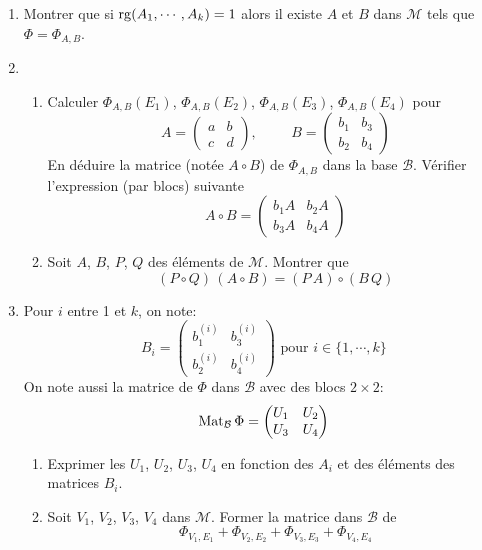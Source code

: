 \begin{enumerate}
\item Montrer que si $\operatorname{rg}(A_1,\cdots,A_k)=1$ alors il existe $A$ et $B$ dans $\mathcal{M}$ tels que $\Phi = \Phi_{A,B}$.

\item
\begin{enumerate}
\item
Calculer $\Phi_{A,B}(E_1)$, $\Phi_{A,B}(E_2)$, $\Phi_{A,B}(E_3)$, $\Phi_{A,B}(E_4)$ pour
\begin{displaymath}
 A=
\begin{pmatrix}
a & b \\ 
c & d
\end{pmatrix}
,\hspace{1cm}
B= 
\begin{pmatrix}
b_{1} & b_{3} \\ 
b_{2} & b_{4}
\end{pmatrix}
\end{displaymath}
En déduire la matrice (notée $A\circ B$) de $\Phi_{A,B}$ dans la base $\mathcal{B}$. Vérifier l'expression (par blocs) suivante
\begin{displaymath}
 A\circ B =
\begin{pmatrix}
 b_1A & b_2A\\ b_3A & b_4 A
\end{pmatrix}
\end{displaymath}
 \item Soit $A$, $B$, $P$, $Q$ des éléments de $\mathcal M$. Montrer que
\begin{displaymath}
 (P\circ Q)\,(A\circ B) = (P\,A)\circ (B\,Q)
\end{displaymath}
\end{enumerate}

\item Pour $i$ entre 1 et $k$, on note:
\begin{displaymath}
 B_i=
\begin{pmatrix}
 b_1^{(i)} & b_3^{(i)} \\ b_2^{(i)} & b_4^{(i)}
\end{pmatrix}
\text{ pour } i\in\{1,\cdots, k\}
\end{displaymath}
On note aussi la matrice de $\Phi$ dans $\mathcal{B}$ avec des blocs $2\times2$:
\begin{displaymath}
 \operatorname{Mat}_\mathcal{B}\Phi=
\begin{pmatrix}
 U_1 & U_2 \\ U_3 & U_4
\end{pmatrix}
\end{displaymath}
\begin{enumerate}
 \item Exprimer les $U_1$, $U_2$, $U_3$, $U_4$ en fonction des $A_i$ et des éléments des matrices $B_i$.
 \item Soit $V_1$, $V_2$, $V_3$, $V_4$ dans $\mathcal{M}$. Former la matrice dans $\mathcal{B}$ de 
\begin{displaymath}
 \Phi_{V_1,E_1}+\Phi_{V_2,E_2}+\Phi_{V_3,E_3}+\Phi_{V_4,E_4}
\end{displaymath}
\end{enumerate}


\end{enumerate}
